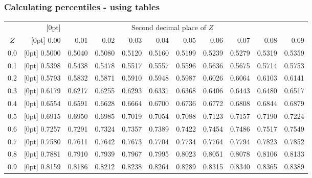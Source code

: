 \documentclass[slidestop,compress,mathserif]{beamer}
\begin{document}
\begin{frame}[fragile]
\frametitle{Calculating percentiles - using tables}

{\footnotesize
\begin{tabular}{c | >{\columncolor[gray]{0.6}[0pt]}rrrrr | rrrrr |}
  \cline{2-11}
&&&& \multicolumn{4}{c}{Second decimal place of $Z$} &&& \\
  \cline{2-11}
$Z$ & 0.00 & 0.01 & 0.02 & 0.03 & 0.04 & 0.05 & 0.06 & 0.07 & 0.08 & 0.09 \\
  \hline
  \hline
0.0 & \tiny{0.5000} & \tiny{0.5040} & \tiny{0.5080} & \tiny{0.5120} & \tiny{0.5160} & \tiny{0.5199} & \tiny{0.5239} & \tiny{0.5279} & \tiny{0.5319} & \tiny{0.5359} \\
  0.1 & \tiny{0.5398} & \tiny{0.5438} & \tiny{0.5478} & \tiny{0.5517} & \tiny{0.5557} & \tiny{0.5596} & \tiny{0.5636} & \tiny{0.5675} & \tiny{0.5714} & \tiny{0.5753} \\
  0.2 & \tiny{0.5793} & \tiny{0.5832} & \tiny{0.5871} & \tiny{0.5910} & \tiny{0.5948} & \tiny{0.5987} & \tiny{0.6026} & \tiny{0.6064} & \tiny{0.6103} & \tiny{0.6141} \\
  0.3 & \tiny{0.6179} & \tiny{0.6217} & \tiny{0.6255} & \tiny{0.6293} & \tiny{0.6331} & \tiny{0.6368} & \tiny{0.6406} & \tiny{0.6443} & \tiny{0.6480} & \tiny{0.6517} \\
  0.4 & \tiny{0.6554} & \tiny{0.6591} & \tiny{0.6628} & \tiny{0.6664} & \tiny{0.6700} & \tiny{0.6736} & \tiny{0.6772} & \tiny{0.6808} & \tiny{0.6844} & \tiny{0.6879} \\
  \hline
  0.5 & \tiny{0.6915} & \tiny{0.6950} & \tiny{0.6985} & \tiny{0.7019} & \tiny{0.7054} & \tiny{0.7088} & \tiny{0.7123} & \tiny{0.7157} & \tiny{0.7190} & \tiny{0.7224} \\
  0.6 & \tiny{0.7257} & \tiny{0.7291} & \tiny{0.7324} & \tiny{0.7357} & \tiny{0.7389} & \tiny{0.7422} & \tiny{0.7454} & \tiny{0.7486} & \tiny{0.7517} & \tiny{0.7549} \\
  0.7 & \tiny{0.7580} & \tiny{0.7611} & \tiny{0.7642} & \tiny{0.7673} & \tiny{0.7704} & \tiny{0.7734} & \tiny{0.7764} & \tiny{0.7794} & \tiny{0.7823} & \tiny{0.7852} \\
  0.8 & \tiny{0.7881} & \tiny{0.7910} & \tiny{0.7939} & \tiny{0.7967} & \tiny{0.7995} & \tiny{0.8023} & \tiny{0.8051} & \tiny{0.8078} & \tiny{0.8106} & \tiny{0.8133} \\
  0.9 & \tiny{0.8159} & \tiny{0.8186} & \tiny{0.8212} & \tiny{0.8238} & \tiny{0.8264} & \tiny{0.8289} & \tiny{0.8315} & \tiny{0.8340} & \tiny{0.8365} & \tiny{0.8389} \\

\end{tabular}}
\end{frame}
\end{document}
